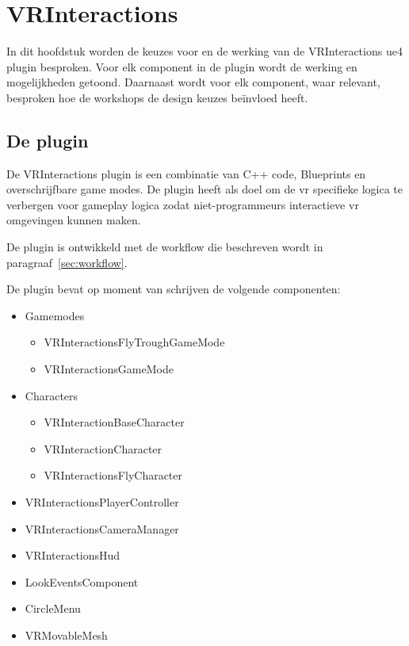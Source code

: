 \lstset {language=C++}

\chapter{VRInteractions}
\label{ch:vrinteractions}
In dit hoofdstuk worden de keuzes voor en de werking van de VRInteractions \gls{ue4} plugin besproken. 
Voor elk component in de plugin wordt de werking en mogelijkheden getoond. Daarnaast wordt voor elk component, waar relevant, besproken hoe de workshops de design keuzes beïnvloed heeft.

\section{De plugin}
De VRInteractions plugin is een combinatie van C++ code, Blueprints en overschrijfbare game modes.
De plugin heeft als doel om de \gls{vr} specifieke logica te verbergen voor gameplay logica zodat niet-programmeurs interactieve \gls{vr} omgevingen kunnen maken.

De plugin is ontwikkeld met de workflow die beschreven wordt in paragraaf~\ref{sec:workflow}.

De plugin bevat op moment van schrijven de volgende componenten:
\begin{itemize}
	\item Gamemodes
		\begin{itemize}
			\item VRInteractionsFlyTroughGameMode
			\item VRInteractionsGameMode
		\end{itemize}
	\item Characters
		\begin{itemize}
			\item VRInteractionBaseCharacter
			\item VRInteractionCharacter
			\item VRInteractionsFlyCharacter
		\end{itemize}
	\item VRInteractionsPlayerController
	\item VRInteractionsCameraManager
	\item VRInteractionsHud
	\item LookEventsComponent
	\item CircleMenu
	\item VRMovableMesh
\end{itemize}


